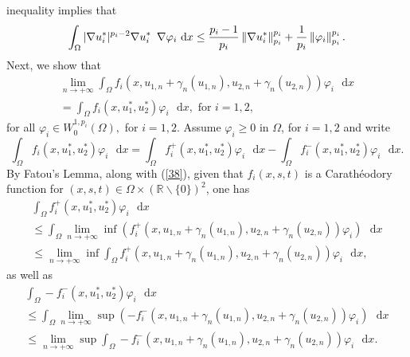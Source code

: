 \documentclass[11pt]{amsart}
\theoremstyle{definition}
\theoremstyle{remark}
\numberwithin{equation}{section}
\begin{document}
inequality implies that%
\begin{equation}
\int_{\Omega }|\nabla u_{i}^{\ast }|^{p_{i}-2}\nabla u_{i}^{\ast }\text{
\thinspace }\nabla \varphi _{i}\text{ }\mathrm{d}x\leq \frac{p_{i}-1}{p_{i}}%
\left\Vert \nabla u_{i}^{\ast }\right\Vert _{p_{i}}^{p_{i}}+\frac{1}{p_{i}}%
\left\Vert \varphi _{i}\right\Vert _{p_{i}}^{p_{i}}.  \label{41}
\end{equation}%
Next, we show that 
\begin{equation}
\begin{array}{l}
\lim_{n\rightarrow +\infty }\int_{\Omega }f_{i}(x,u_{1,n}+\gamma
_{n}(u_{1,n}),u_{2,n}+\gamma _{n}(u_{2,n}))\varphi _{i}\text{ }\mathrm{d}x
\\ 
=\int_{\Omega }f_{i}(x,u_{1}^{\ast },u_{2}^{\ast })\varphi _{i}\text{ }%
\mathrm{d}x,\text{ for }i=1,2,%
\end{array}
\label{42}
\end{equation}%
for all $\varphi _{i}\in W_{0}^{1,p_{i}}(\Omega ),$ for $i=1,2.$ Assume $%
\varphi _{i}\geq 0$ in $\Omega $, for $i=1,2$ and write%
\begin{equation*}
\int_{\Omega }f_{i}(x,u_{1}^{\ast },u_{2}^{\ast })\varphi _{i}\text{ }%
\mathrm{d}x=\int_{\Omega }f_{i}^{+}(x,u_{1}^{\ast },u_{2}^{\ast })\varphi
_{i}\text{ }\mathrm{d}x-\int_{\Omega }f_{i}^{-}(x,u_{1}^{\ast },u_{2}^{\ast
})\varphi _{i}\text{ }\mathrm{d}x.
\end{equation*}%
By Fatou's Lemma, along with (\ref{38}), given that $f_{i}(x,s,t)$ is a
Carath\'{e}odory function for $(x,s,t)\in \Omega \times (%
\mathbb{R}
\backslash \{0\})^{2}$, one has%
\begin{equation*}
\begin{array}{l}
\int_{\Omega }f_{i}^{+}(x,u_{1}^{\ast },u_{2}^{\ast })\varphi _{i}\text{ }%
\mathrm{d}x \\ 
\leq \int_{\Omega }\lim_{n\rightarrow +\infty }\inf
(f_{i}^{+}(x,u_{1,n}+\gamma _{n}(u_{1,n}),u_{2,n}+\gamma
_{n}(u_{2,n}))\varphi _{i})\text{ }\mathrm{d}x \\ 
\leq \lim_{n\rightarrow +\infty }\inf \int_{\Omega
}f_{i}^{+}(x,u_{1,n}+\gamma _{n}(u_{1,n}),u_{2,n}+\gamma
_{n}(u_{2,n}))\varphi _{i}\text{ }\mathrm{d}x,%
\end{array}%
\end{equation*}%
as well as%
\begin{equation*}
\begin{array}{l}
\int_{\Omega }-f_{i}^{-}(x,u_{1}^{\ast },u_{2}^{\ast })\varphi _{i}\text{ }%
\mathrm{d}x \\ 
\leq \int_{\Omega }\lim_{n\rightarrow +\infty }\sup
(-f_{i}^{-}(x,u_{1,n}+\gamma _{n}(u_{1,n}),u_{2,n}+\gamma
_{n}(u_{2,n}))\varphi _{i})\text{ }\mathrm{d}x \\ 
\leq \lim_{n\rightarrow +\infty }\sup \int_{\Omega
}-f_{i}^{-}(x,u_{1,n}+\gamma _{n}(u_{1,n}),u_{2,n}+\gamma
_{n}(u_{2,n}))\varphi _{i}\text{ }\mathrm{d}x.%
\end{array}%
\end{equation*}%
\end{document}
